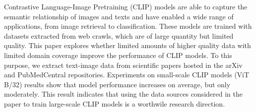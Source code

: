 Contrastive Language-Image Pretraining (CLIP) models are able to capture the semantic relationship of images and texts and have enabled a wide range of  applications, from image retrieval to classification. These models are trained with datasets extracted from web crawls, which are of large quantity but limited quality. This paper explores whether limited amounts of higher quality data with limited domain coverage improve the performance of CLIP models. To this purpose, we extract text-image data from scientific papers hosted in the arXiv and PubMedCentral repositories.
Experiments on small-scale CLIP models (ViT B/32) results show that model performance increases on average, but only moderately. This result indicates that using the data sources considered in the paper to train large-scale CLIP models is a worthwile research direction.
